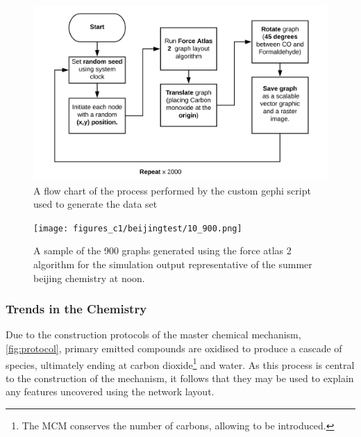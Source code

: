     \begin{figure}[H]
         \centering
     \includegraphics[width=\textwidth]{figures_c1/flowrepeat.png}
     \caption{ A flow chart of the process performed by the custom gephi script used to generate the data set}
     \label{fig:flowrepeat}
     \end{figure}
 
    \begin{figure}[H]
         \centering
     \texttt{[image: figures\_c1/beijingtest/10\_900.png]}
     \caption{A sample of the 900 graphs generated using the force atlas 2 algorithm for the simulation output representative of the summer beijing chemistry at noon.  }
     \label{fig:all}
     \end{figure}
 

\subsubsection{Trends in the Chemistry}
Due to the construction protocols of the master chemical mechanism, \autoref{fig:protocol}, primary emitted compounds are oxidised to produce a cascade of species, ultimately ending at carbon dioxide\footnote{The MCM conserves the number of carbons, allowing  to be introduced.} and water. As this process is central to the construction of the mechanism, it follows that they may be used to explain any features uncovered using the network layout. 

